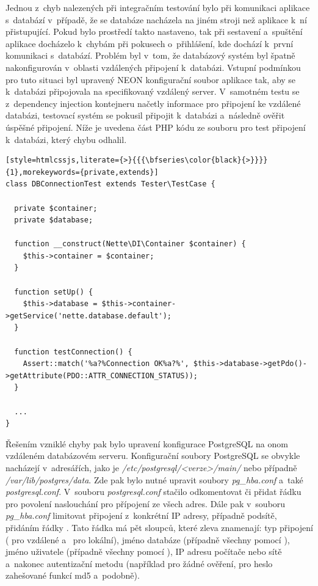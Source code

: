 \documentclass[thesis=M,czech]{FITthesis}[2012/06/26]
\begin{document}
Jednou z~chyb nalezených při integračním testování bylo při komunikaci aplikace s~databází v~případě, že se databáze nacházela na jiném stroji než aplikace k~ní přistupující. Pokud bylo prostředí takto nastaveno, tak při sestavení a~spuštění aplikace docházelo k~chybám při pokusech o~přihlášení, kde dochází k~první komunikaci s~databází. Problém byl v~tom, že databázový systém byl špatně nakonfigurován v~oblasti vzdálených připojení k~databázi. Vstupní podmínkou pro tuto situaci byl upravený NEON konfigurační soubor aplikace tak, aby se k~databázi připojovala na specifikovaný vzdálený server. V~samotném testu se z~dependency injection kontejneru načetly informace pro připojení ke vzdálené databázi, testovací systém se pokusil připojit k~databázi a~následně ověřit úspěšné připojení. Níže je uvedena část PHP kódu ze souboru pro test připojení k~databázi, který chybu odhalil.\\

\begin{lstlisting}[style=htmlcssjs,literate={>}{{{\bfseries\color{black}{>}}}}{1},morekeywords={private,extends}]
class DBConnectionTest extends Tester\TestCase {

  private $container;
  private $database;

  function __construct(Nette\DI\Container $container) {
    $this->container = $container;
  }
  
  function setUp() {
    $this->database = $this->container->getService('nette.database.default');
  }

  function testConnection() {
    Assert::match('%a?%Connection OK%a?%', $this->database->getPdo()->getAttribute(PDO::ATTR_CONNECTION_STATUS));
  }
  
  ...
}
\end{lstlisting}

	Řešením vzniklé chyby pak bylo upravení konfigurace PostgreSQL na onom vzdáleném databázovém serveru. Konfigurační soubory PostgreSQL se  obvykle nacházejí v~adresářích, jako je \textit{/etc/postgresql/<verze>/main/} nebo případně \textit{/var/lib/postgres/data}. Zde pak bylo nutné upravit soubory \textit{pg\_hba.conf} a~také \textit{postgresql.conf}. V~souboru \textit{postgresql.conf} stačilo odkomentovat či přidat řádku  pro povolení naslouchání pro přípojení ze všech adres. Dále pak v~souboru \textit{pg\_hba.conf} limitovat připojení z~konkrétní IP adresy, případně podsítě, přidáním řádky . Tato řádka má pět sloupců, které zleva znamenají: typ připojení ( pro vzdálené a~ pro lokální), jméno databáze (případně všechny pomocí ), jméno uživatele (případně všechny pomocí ), IP adresu počítače nebo sítě a~nakonec autentizační metodu (například  pro žádné ověření,  pro heslo zahešované funkcí md5 a~podobně).
\end{document}
